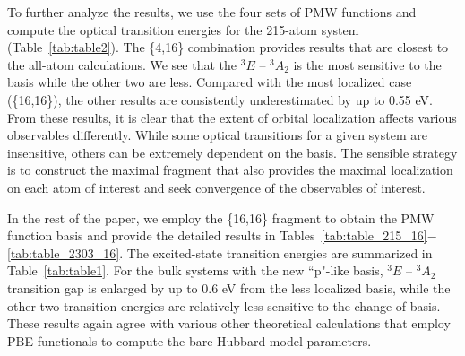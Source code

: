 \documentclass[journal=jacsat,manuscript=article]{achemso}
\begin{document}
To further analyze the results, we use the four sets of PMW functions and compute the optical transition energies for the 215-atom system (Table~\ref{tab:table2}). The \{4,16\} combination provides results that are closest to the all-atom calculations. We see that the $^3E$ -- $^3A_2$ is the most sensitive to the basis while the other two are less. Compared with the most localized case (\{16,16\}), the other results are consistently underestimated by up to 0.55 eV. From these results, it is clear that the extent of orbital localization affects various observables differently. While some optical transitions for a given system are insensitive, others can be extremely dependent on the basis. The sensible strategy is to construct the maximal fragment that also provides the maximal localization on each atom of interest and seek convergence of the observables of interest.

\begin{table}[H]
\centering
\caption{Excited-state transition energies of the NV$^-$ center in the 215-atom system using the Wannier function basis obtained from different sizes of the fragment as well as the all-atom calculation.}
\label{tab:table2}
\end{table}

In the rest of the paper, we employ the \{16,16\} fragment to obtain the PMW function basis and provide the detailed results in Tables~\ref{tab:table_215_16}$-$\ref{tab:table_2303_16}. The excited-state transition energies are summarized in Table~\ref{tab:table1}. For the bulk systems with the new ``p"-like basis, $^3E$ -- $^3A_2$ transition gap is enlarged by up to 0.6 eV from the less localized basis, while the other two transition energies are relatively less sensitive to the change of basis. These results again agree with various other theoretical calculations that employ PBE functionals to compute the bare Hubbard model parameters\cite{Goss1996,Gali2008,Delaney2010,Ma2010,Gordon2013,Alkauskas2014a}. 
\end{document}
